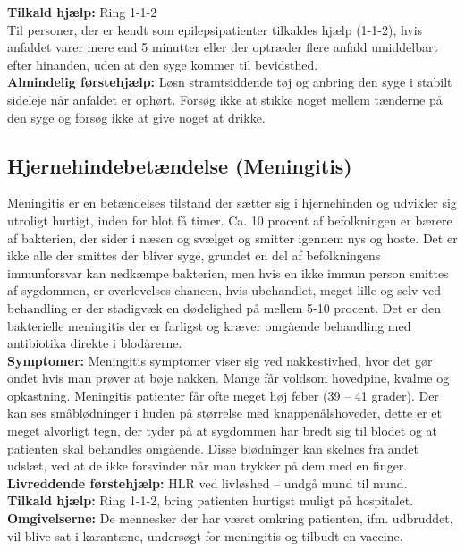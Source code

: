 \documentclass[../../../main.tex]{subfiles}
\begin{document}
\begin{multicols}{2}
\textbf{Tilkald hjælp:} Ring 1-1-2
\\

\textbf{}
Til personer, der er kendt som epilepsipatienter
tilkaldes hjælp (1-1-2), hvis anfaldet varer mere end
5 minutter eller der optræder flere anfald umiddelbart
efter hinanden, uden at den syge kommer til
bevidsthed.
\\

\textbf{Almindelig førstehjælp:} Løsn stramtsiddende tøj og anbring den syge i stabilt sideleje når anfaldet er ophørt. Forsøg ikke at stikke noget mellem tænderne på den syge og forsøg ikke at give noget at drikke.
\\
\subsection*{Hjernehindebetændelse (Meningitis)}
Meningitis er en betændelses tilstand der sætter sig i hjernehinden og udvikler sig utroligt hurtigt, inden for blot få timer. Ca. 10 procent af befolkningen er bærere af bakterien, der sider i næsen og svælget og smitter igennem nys og hoste. Det er ikke alle der smittes der bliver syge, grundet en del af befolkningens immunforsvar kan nedkæmpe bakterien, men hvis en ikke immun person smittes af sygdommen, er overlevelses chancen, hvis ubehandlet, meget lille og selv ved behandling er der stadigvæk en dødelighed på mellem 5-10 procent. Det er den bakterielle meningitis der er farligst og kræver omgående behandling med antibiotika direkte i blodårerne.
\\

\textbf{Symptomer:} Meningitis symptomer viser sig ved nakkestivhed, hvor det gør ondet hvis man prøver at bøje nakken. Mange får voldsom hovedpine, kvalme og opkastning. Meningitis patienter får ofte meget høj feber (39 – 41 grader). Der kan ses småblødninger i huden på størrelse med knappenålshoveder, dette er et meget alvorligt tegn, der tyder på at sygdommen har bredt sig til blodet og at patienten skal behandles omgående. Disse blødninger kan skelnes fra andet udslæt, ved at de ikke forsvinder når man trykker på dem med en finger.
\\

\textbf{Livreddende førstehjælp:} HLR ved livløshed – undgå mund til mund.
\\

\textbf{Tilkald hjælp:} Ring 1-1-2, bring patienten hurtigst muligt på
hospitalet.
\\

\textbf{Omgivelserne:} De mennesker der har været omkring patienten, ifm.
udbruddet, vil blive sat i karantæne, undersøgt for meningitis og tilbudt en vaccine.
\\

\end{multicols}
\end{document}
